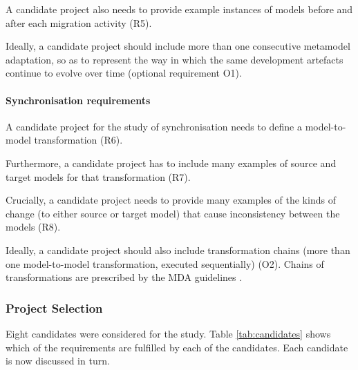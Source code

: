 A candidate project also needs to provide example instances of models before and after each migration activity (R5).

Ideally, a candidate project should include more than one consecutive metamodel adaptation, so as to represent the way in which the same development artefacts continue to evolve over time (optional requirement O1).

\paragraph{Synchronisation requirements}
A candidate project for the study of synchronisation needs to define a model-to-model transformation (R6).

Furthermore, a candidate project has to include many examples of source and target models for that transformation (R7).

Crucially, a candidate project needs to provide many examples of the kinds of change (to either source or target model) that cause inconsistency between the models (R8). 

Ideally, a candidate project should also include transformation chains (more than one model-to-model transformation, executed sequentially) (O2). Chains of transformations are prescribed by the MDA guidelines \cite{kleppe03mda}.


\subsubsection{Project Selection} %
\label{ssub:project_selection}
Eight candidates were considered for the study. Table \ref{tab:candidates} shows which of the requirements are fulfilled by each of the candidates. Each candidate is now discussed in turn.

